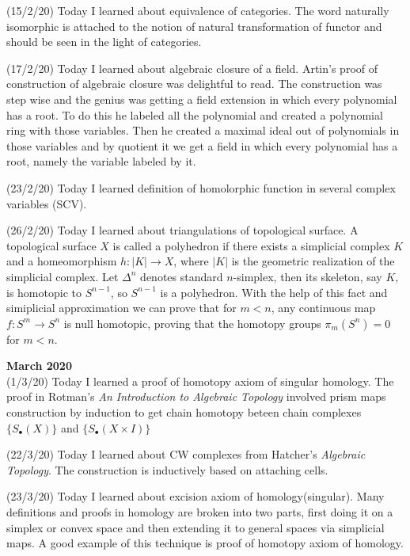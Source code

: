 \documentclass[12pt,a4paper]{article}
\begin{document}
(15/2/20) Today I learned about equivalence of categories. The word naturally isomorphic is attached to the notion of natural transformation of functor and should be seen in the light of categories.

(17/2/20) Today I learned about algebraic closure of a field. Artin's proof of construction of algebraic closure was delightful to read. The construction was step wise and the genius was getting a field extension in which every polynomial has a root. To do this he labeled all the polynomial and created a polynomial ring with those variables. Then he created a maximal ideal out of polynomials in those variables and by quotient it we get a field in which every polynomial has a root, namely the variable labeled by it.

(23/2/20) Today I learned definition of homolorphic function in several complex variables (SCV).

(26/2/20) Today I learned about triangulations of topological surface. A topological surface $X$ is called a polyhedron if there exists a simplicial complex $K$ and a homeomorphism $h : |K| \to X$, where $|K|$ is the geometric realization of the simplicial complex. Let $\Delta^n$ denotes standard $n$-simplex, then its skeleton, say $K$, is homotopic to $S^{n-1}$, so $S^{n-1}$ is a polyhedron. With the help of this fact and simiplicial approximation we can prove that for $m<n$, any continuous map $f: S^m \to S^n$ is null homotopic, proving that the homotopy groups $\pi_m(S^n) = 0$ for $m<n$.
\\

\maketitle\textbf{March 2020}
\\

(1/3/20) Today I learned a proof of homotopy axiom of singular homology. The proof in Rotman's \textit{An Introduction to Algebraic Topology} involved prism maps construction by induction to get chain homotopy beteen chain complexes $\{S_\bullet(X)\}$ and $\{S_\bullet(X \times I)\}$

(22/3/20) Today I learned about CW complexes from Hatcher's \textit{Algebraic Topology}. The construction is inductively based on attaching cells.

(23/3/20) Today I learned about excision axiom of homology(singular). Many definitions and proofs in homology are broken into two parts, first doing it on a simplex or convex space and then extending it to general spaces via simplicial maps. A good example of this technique is proof of homotopy axiom of homology. 
\end{document}
